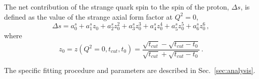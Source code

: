   The net contribution of the strange quark spin to the spin of the proton,
  $\Delta s$, is defined as the value of the strange axial form factor at $Q^2
  = 0$,
  \begin{equation}
    \Delta s = a_0^s + a_1^s z_0 + a_2^s z_0^2 
      + a_3^s z_0^3 + a_4^s z_0^4 + a_5^s z_0^5 + a_6^s z_0^6 \,,
  \end{equation}
  where
  \begin{equation}
    z_0 = z(Q^2 = 0,t_{cut},t_0) = \frac{\sqrt{t_{cut}} - \sqrt{t_{cut} - t_0}}{\sqrt{t_{cut}} + \sqrt{t_{cut} - t_0}} \,.
  \end{equation}

  The specific fitting procedure and parameters are described in
  Sec.~\ref{sec:analysis}.


